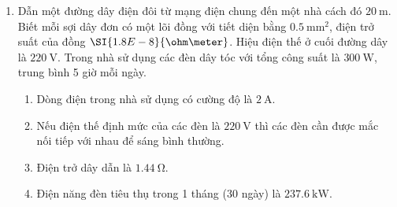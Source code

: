 \begin{enumerate}[label=\bfseries Câu \arabic*:]
\item Dẫn một đường dây điện đôi từ mạng điện chung đến một nhà cách đó $\SI{20}{\meter}$. Biết mỗi sợi dây đơn có một lõi đồng với tiết diện bằng $\SI{0.5}{\milli\meter^2}$, điện trở suất của đồng $\SI{1.8E-8}{\ohm\meter}$. Hiệu điện thế ở cuối đường dây là $\SI{220}{\volt}$. Trong nhà sử dụng các đèn dây tóc với tổng công suất là $\SI{300}{\watt}$, trung bình 5 giờ mỗi ngày.
\begin{enumerate}[label=\alph*)]
	\item Dòng điện trong nhà sử dụng có cường độ là $\SI{2}{\ampere}$.
	\item Nếu điện thế định mức của các đèn là $\SI{220}{\volt}$ thì các đèn cần được mắc nối tiếp với nhau để sáng bình thường.
	\item Điện trở dây dẫn là $\SI{1.44}{\ohm}$.
	\item Điện năng đèn tiêu thụ trong 1 tháng (30 ngày) là $\SI{237.6}{\kilo\watt}$.
\end{enumerate}


\end{enumerate}
